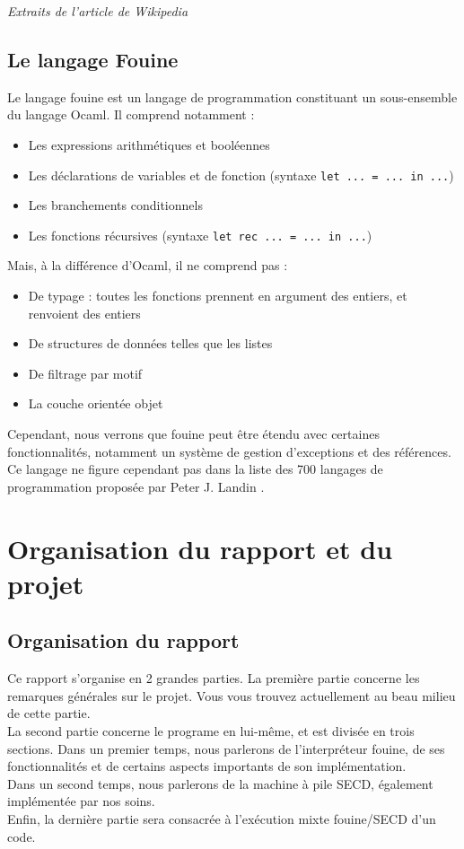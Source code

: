 \textit{Extraits de l'article de Wikipedia \cite{WikiFouine}}

\subsection{Le langage Fouine}

Le langage fouine est un langage de programmation constituant un sous-ensemble du langage Ocaml. Il comprend notamment :
\begin{itemize}
 \item Les expressions arithmétiques et booléennes
 \item Les déclarations de variables et de fonction (syntaxe \texttt{let ... = ... in ...})
 \item Les branchements conditionnels
 \item Les fonctions récursives (syntaxe \texttt{let rec ... = ... in ...})
\end{itemize}

Mais, à la différence d'Ocaml, il ne comprend pas :
\begin{itemize}
 \item De typage : toutes les fonctions prennent en argument des entiers, et renvoient des entiers
 \item De structures de données telles que les listes
 \item De filtrage par motif
 \item La couche orientée objet
\end{itemize}

Cependant, nous verrons que fouine peut être étendu avec certaines fonctionnalités, notamment un système de gestion d'exceptions et des références.\\
Ce langage ne figure cependant pas dans la liste des 700 langages de programmation proposée par Peter J. Landin \cite{DBLP:journals/cacm/Landin66}.

\section{Organisation du rapport et du projet}

\subsection{Organisation du rapport}

Ce rapport s'organise en 2  grandes parties. La première partie concerne les remarques générales sur le projet. Vous vous trouvez actuellement au beau milieu de cette partie. \\
La second partie concerne le programe en lui-même, et est divisée en trois sections.
Dans un premier temps, nous parlerons de l'interpréteur fouine, de ses fonctionnalités et de certains aspects importants de son implémentation. \\
Dans un second temps, nous parlerons de la machine à pile SECD, également implémentée par nos soins. \\
Enfin, la dernière partie sera consacrée à l'exécution mixte fouine/SECD d'un code.

